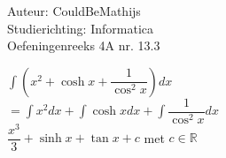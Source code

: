 \documentclass[a4paper]{article}
\newcommand{\intt}{\displaystyle\int}
\begin{document}
  
\noindent \large Auteur: CouldBeMathijs \\
\noindent \large Studierichting: Informatica\\
\noindent \large Oefeningenreeks 4A nr. 13.3\\

\medskip

\normalsize

$\intt \left(x^2 + \cosh x + \dfrac{1}{\cos^2x}\right)dx$\\

$= \intt x^2 dx + \intt \cosh x dx + \intt \dfrac{1}{\cos^2x} dx$\\

$ \dfrac{x^3}{3} + \sinh x + \tan x + c$  met  $c \in \mathbb{R}$

\begin{thebibliography}{999}
\end{thebibliography}
\end{document}
